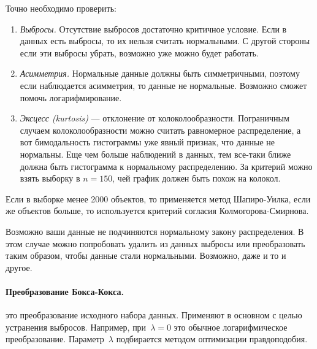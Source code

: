 \documentclass[../handbook.tex]{subfiles}
\begin{document}
Точно необходимо проверить:
\begin{enumerate}
    \item \emph{Выбросы.} Отсутствие выбросов достаточно критичное условие. Если в данных есть выбросы, то их нельзя считать нормальными. С другой стороны если эти выбросы убрать, возможно уже можно будет работать.

    
    \item \emph{Асимметрия.}\marginnote{ \[A = \frac{\mu_3}{\sigma^3}\]}
        Нормальные данные должны быть симметричными, поэтому если наблюдается асимметрия, то данные не нормальные. Возможно сможет помочь логарифмирование. 

    \item \emph{Эксцесс (kurtosis)} --- отклонение от колоколообразности.
        \marginnote{ \[\gamma_2 = \frac{\mu_4}{\sigma^4} - 3\]}
        Пограничным случаем колоколообразности можно считать равномерное распределение, а вот бимодальность гистограммы уже явный признак, что данные не нормальны. Еще чем больше наблюдений в данных, тем все-таки ближе должна быть гистограмма к нормальному распределению. За критерий можно взять выборку в $n=150$, чей график должен быть похож на колокол.
\end{enumerate}

Если в выборке менее 2000 объектов, то применяется метод Шапиро-Уилка, если же объектов больше, то используется критерий согласия Колмогорова-Смирнова.

Возможно ваши данные не подчиняются нормальному закону распределения. В этом случае можно попробовать удалить из данных выбросы или преобразовать таким образом, чтобы данные стали нормальными. Возможно, даже и то и другое.

\paragraph{Преобразование Бокса-Кокса.} 
это преобразование исходного набора
данных. Применяют в основном с целью устранения выбросов. Например,
при~$\lambda = 0$ это обычное логарифмическое преобразование.
Параметр~$\lambda$ подбирается методом оптимизации правдоподобия.
\end{document}
